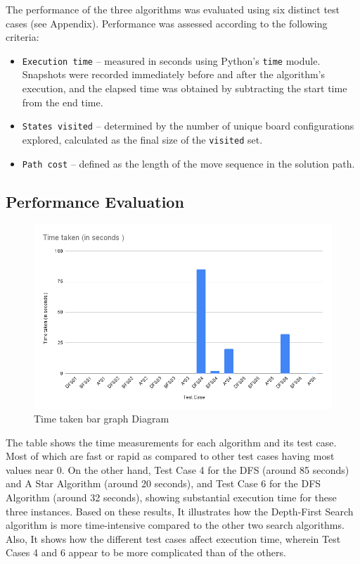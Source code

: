 \documentclass[journal]{./IEEE/IEEEtran}
\begin{document}
The performance of the three algorithms was evaluated using six distinct test cases (see Appendix). 
Performance was assessed according to the following criteria:

\begin{itemize}
    \item \texttt{Execution time} – measured in seconds using Python's \texttt{time} module. Snapshots were recorded immediately before and after the algorithm’s execution, and the elapsed time was obtained by subtracting the start time from the end time.  
    \item \texttt{States visited} – determined by the number of unique board configurations explored, calculated as the final size of the \texttt{visited} set.  
    \item \texttt{Path cost} – defined as the length of the move sequence in the solution path.  
\end{itemize}

\subsection{Performance Evaluation}
\begin{figure}[H]
    \centering
    \includegraphics[width=1\linewidth]{pictures-Elisha/Time taken (in seconds ).png}
    \caption{Time taken bar graph Diagram}
    \label{fig:time_bar_graph}
\end{figure}

The table shows the time measurements for each algorithm and its test case. Most of which are fast or 
rapid as compared to other test cases having most values near 0. On the other hand, Test Case 4 for the 
DFS (around 85 seconds) and A Star Algorithm (around 20 seconds), and Test Case 6  for the DFS Algorithm (around 32 seconds), 
showing substantial execution time for these three instances. Based on these results, It illustrates how the Depth-First 
Search algorithm is more time-intensive compared to the other two search algorithms. Also, It shows how the 
different test cases affect execution time, wherein Test Cases 4 and 6 appear to be more complicated than of the others. 
\end{document}
